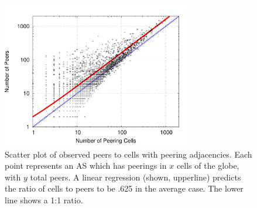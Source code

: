 
    \begin{figure}[tb]
\centering
\includegraphics[width=3.25in]{scatter}
\caption[]{\label{fig:scatter} Scatter plot of observed peers to cells with peering adjacencies. Each point represents an AS which has peerings in $x$ cells of the globe, with $y$ total peers. A linear regression (shown, upperline) predicts the ratio of cells to peers to be .625 in the average case. The lower line shows a 1:1 ratio.} 
\end{figure}


